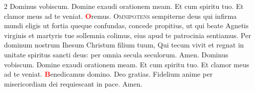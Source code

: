 \begin{multicols}{2}
\newline Dominus vobiscum.  Domine exaudi orationem meam.
\newline \R Et cum spiritu tuo.  Et clamor meus ad te veniat.
\newline \textcolor{Red}{\bfseries O}remus. 
\lettrine[lines=2]{\zallmancaps \color{Red} O}{mnipotens} sempiterne deus qui infirma mundi eligis ut fortia queque confundas, concede propitius, ut qui beate Agnetis virginis et martyris tue sollemnia colimus, eius apud te patrocinia sentiamus. Per dominum nostrum Ihesum Christum filium tuum, Qui tecum vivit et regnat in unitate spiritus sancti deus: per omnia secula seculorum. \R Amen.
\newline {} Dominus vobiscum.  Domine exaudi orationem meam.
\newline \R Et cum spiritu tuo.  Et clamor meus ad te veniat.
\newline \textcolor{Red}{\bfseries B}enedicamus domino. \R Deo gratias.
\newline {}
\newline Fidelium anime per misericordiam dei requiescant in pace. \R Amen.
\newline {}



\end{multicols}

